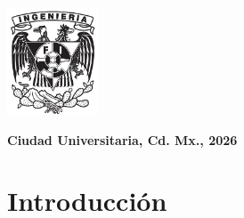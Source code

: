 \documentclass[12pt,twoside]{report}
\begin{document}
\vspace{2cm}

\begin{minipage}[t]{4cm}
  \includegraphics[height=3.2cm]{images/escudofi_negro.jpg}
\end{minipage}
\hspace{5cm}
\begin{minipage}[t]{9cm}
  \raggedleft
  \textbf{Ciudad Universitaria, Cd. Mx., 2026}
\end{minipage}

\restoregeometry
\newpage
\tableofcontents

\chapter{Introducci\'on}


% 



\end{document}

